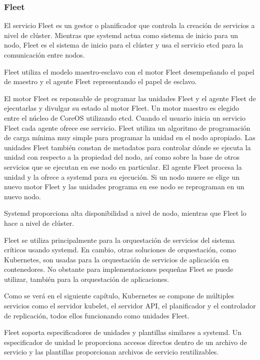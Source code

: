\subsubsection{Fleet}

El servicio Fleet es un gestor o planificador que controla la creación de servicios a nivel de clúster. Mientras que systemd actua como sistema de inicio para un nodo, Fleet es el sistema de inicio para el clúster y usa el servicio etcd para la comunicación entre nodos.

Fleet utiliza el modelo maestro-esclavo con el motor Fleet desempeñando el papel de maestro y el agente Fleet representando el papel de esclavo.

El motor Fleet es reponsable de programar las unidades Fleet y el agente Fleet de ejecutarlas y divulgar su estado al motor Fleet. Un motor maestro es elegido entre el núcleo de CoreOS utilizando etcd. Cuando el usuario inicia un servicio Fleet cada agente ofrece ese servicio. Fleet utiliza un algoritmo de programación de carga mínima muy simple para programar la unidad en el nodo apropiado. Las unidades Fleet también constan de metadatos para controlar dónde se ejecuta la unidad con respecto a la propiedad del nodo, así como sobre la base de otros servicios que se ejecutan en ese nodo en particular. El agente Fleet procesa la unidad y la ofrece a systemd para su ejecución. Si un nodo muere se elige un nuevo motor Fleet y las unidades programa en ese nodo se reprograman en un nuevo nodo. 

Systemd proporciona alta disponibilidad a nivel de nodo, mientras que Fleet lo hace a nivel de clúster.

Fleet se utiliza principalmente para la orquestación de servicios del sistema críticos usando systemd. En cambio, otras soluciones de orquestación, como Kubernetes, son usadas para la orquestación de servicios de aplicación en contenedores. No obstante para implementaciones pequeñas Fleet se puede utilizar, también para la orquestación de aplicaciones.

Como se verá en el siguiente capítulo, Kubernetes se compone de múltiples servicios como el servidor kubelet, el servidor API, el planificador y el controlador de replicación, todos ellos funcionando como unidades Fleet. 

Fleet soporta especificadores de unidades y plantillas similares a systemd. Un especificador de unidad le proporciona accesos directos dentro de un archivo de servicio y las plantillas proporcionan archivos de servicio reutilizables.


